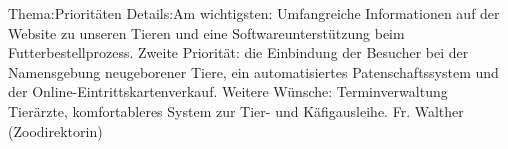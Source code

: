 
%
	{Thema:}{Prioritäten}%
	{Details:}{Am wichtigsten: Umfangreiche Informationen auf der Website zu unseren Tieren und eine Softwareunterstützung beim Futterbestellprozess. \newline Zweite Priorität: die Einbindung der Besucher bei der Namensgebung neugeborener Tiere, ein automatisiertes Patenschaftssystem und der Online-Eintrittskartenverkauf. \newline Weitere Wünsche: Terminverwaltung Tierärzte, komfortableres System zur Tier- und Käfigausleihe.}%
	{Fr. Walther (Zoodirektorin)}
	
	
	
